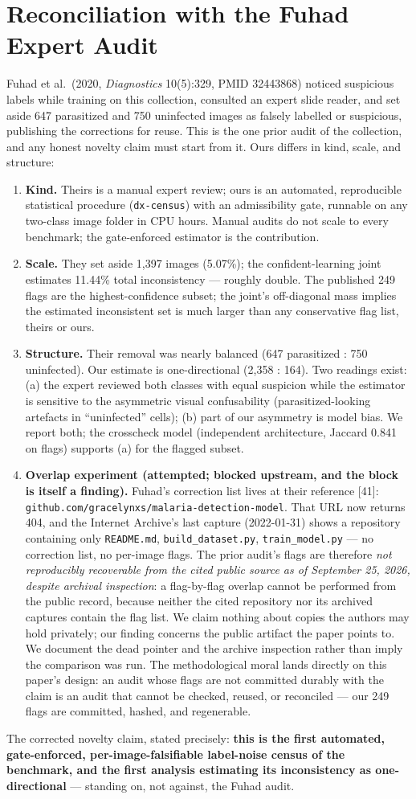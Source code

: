 
\section{Reconciliation with the Fuhad Expert Audit}
\label{sec:fuhad}
Fuhad et al.\ (2020, \emph{Diagnostics} 10(5):329, PMID 32443868) noticed
suspicious labels while training on this collection, consulted an expert
slide reader, and set aside 647 parasitized and 750 uninfected images as
falsely labelled or suspicious, publishing the corrections for reuse.
This is the one prior audit of the collection, and any honest novelty
claim must start from it. Ours differs in kind, scale, and structure:
\begin{enumerate}
\item \textbf{Kind.} Theirs is a manual expert review; ours is an
automated, reproducible statistical procedure (\texttt{dx-census}) with
an admissibility gate, runnable on any two-class image folder in CPU
hours. Manual audits do not scale to every benchmark; the gate-enforced
estimator is the contribution.
\item \textbf{Scale.} They set aside 1{,}397 images (5.07\%); the
confident-learning joint estimates 11.44\% total inconsistency ---
roughly double. The published 249 flags are the highest-confidence
subset; the joint's off-diagonal mass implies the estimated
inconsistent set is much larger than any conservative flag list,
theirs or ours.
\item \textbf{Structure.} Their removal was nearly balanced
(647 parasitized : 750 uninfected). Our estimate is one-directional
(2{,}358 : 164). Two readings exist: (a) the expert reviewed both classes
with equal suspicion while the estimator is sensitive to the asymmetric
visual confusability (parasitized-looking artefacts in ``uninfected''
cells); (b) part of our asymmetry is model bias. We report both; the
crosscheck model (independent architecture, Jaccard 0.841 on flags)
supports (a) for the flagged subset.
\item \textbf{Overlap experiment (attempted; blocked upstream, and the
block is itself a finding).} Fuhad's correction list lives at their
reference [41]: \texttt{github.com/gracelynxs/malaria-detection-model}.
That URL now returns 404, and the Internet Archive's last capture
(2022-01-31) shows a repository containing only \texttt{README.md},
\texttt{build\_dataset.py}, \texttt{train\_model.py} --- no
correction list, no per-image flags. The prior audit's flags are
therefore \emph{not reproducibly recoverable from the cited public
source as of September 25, 2026, despite archival inspection}: a
flag-by-flag overlap cannot be performed from the public record,
because neither the cited repository nor its archived captures contain
the flag list. We claim nothing about copies the authors may hold
privately; our finding concerns the public artifact the paper points
to. We document the dead pointer and the archive inspection rather
than imply the comparison was run. The methodological moral lands directly on this
paper's design: an audit whose flags are not committed durably with the
claim is an audit that cannot be checked, reused, or reconciled --- our
249 flags are committed, hashed, and regenerable.
\end{enumerate}
The corrected novelty claim, stated precisely: \textbf{this is the first
automated, gate-enforced, per-image-falsifiable label-noise census of the
benchmark, and the first analysis estimating its inconsistency as
one-directional} --- standing on, not against, the Fuhad audit.
